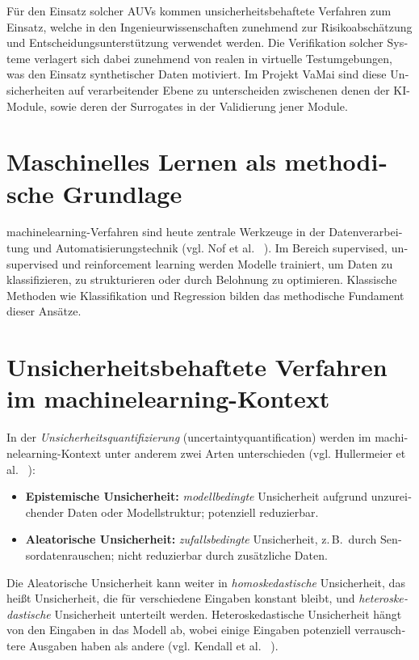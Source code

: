 \begin{otherlanguage}{ngerman}
Für den Einsatz solcher AUVs kommen unsicherheitsbehaftete Verfahren zum Einsatz, welche in den Ingenieurwissenschaften zunehmend zur Risikoabschätzung und Entscheidungsunterstützung verwendet werden. Die Verifikation solcher Systeme verlagert sich dabei zunehmend von realen in virtuelle Testumgebungen, was den Einsatz synthetischer Daten motiviert. Im Projekt VaMai sind diese Unsicherheiten auf verarbeitender Ebene zu unterscheiden zwischenen denen der KI-Module, sowie deren der Surrogates in der Validierung jener Module.


\section{Maschinelles Lernen als methodische Grundlage}

\gls{machinelearning}-Verfahren sind heute zentrale Werkzeuge in der Datenverarbeitung und Automatisierungstechnik (vgl. Nof et al. ~\parencite{Nof2023}). Im Bereich supervised, unsupervised und reinforcement learning werden Modelle trainiert, um Daten zu klassifizieren, zu strukturieren oder durch Belohnung zu optimieren. Klassische Methoden wie Klassifikation und Regression bilden das methodische Fundament dieser Ansätze.

\section{Unsicherheitsbehaftete Verfahren im \gls{machinelearning}-Kontext}

In der \textit{Unsicherheitsquantifizierung} (\gls{uncertaintyquantification}) werden im \gls{machinelearning}-Kontext unter anderem zwei Arten unterschieden (vgl. Hullermeier et al. ~\parencite{Hullermeier2021}):

\begin{itemize}
  \item \textbf{\gls{Epistemische Unsicherheit}:} \textit{modellbedingte} Unsicherheit aufgrund unzureichender Daten oder Modellstruktur; potenziell reduzierbar.
  \item \textbf{\gls{Aleatorische Unsicherheit}:} \textit{zufallsbedingte} Unsicherheit, z.\,B.\ durch Sensordatenrauschen; nicht reduzierbar durch zusätzliche Daten.
\end{itemize}

Die \gls{Aleatorische Unsicherheit} kann weiter in \textit{homoskedastische} Unsicherheit, das heißt Unsicherheit, die für verschiedene Eingaben konstant bleibt, und \textit{heteroskedastische} Unsicherheit unterteilt werden. Heteroskedastische Unsicherheit hängt von den Eingaben in das Modell ab, wobei einige Eingaben potenziell verrauschtere Ausgaben haben als andere (vgl. Kendall et al. ~\parencite[S. 2, Z. 1-5]{kendall2017}).


\end{otherlanguage}
